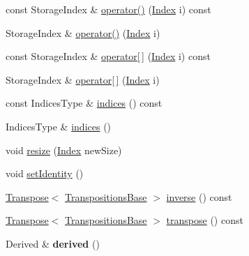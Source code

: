 \begin{DoxyCompactItemize}
const Storage\+Index \& \hyperlink{class_eigen_1_1_transpositions_base_a150860addd2418f37da291f0ad9395f2}{operator()} (\hyperlink{class_eigen_1_1_transpositions_base_a3f5f06118b419e8e6ccbe49ed5b4c91f}{Index} i) const
\item 
Storage\+Index \& \hyperlink{class_eigen_1_1_transpositions_base_a8b3eb221d9ec1e51a161d276a0020e24}{operator()} (\hyperlink{class_eigen_1_1_transpositions_base_a3f5f06118b419e8e6ccbe49ed5b4c91f}{Index} i)
\item 
const Storage\+Index \& \hyperlink{class_eigen_1_1_transpositions_base_a689c79a6cdac938218de46638decb895}{operator\mbox{[}$\,$\mbox{]}} (\hyperlink{class_eigen_1_1_transpositions_base_a3f5f06118b419e8e6ccbe49ed5b4c91f}{Index} i) const
\item 
Storage\+Index \& \hyperlink{class_eigen_1_1_transpositions_base_a8951554cfdf4840b4bab9864caecc60a}{operator\mbox{[}$\,$\mbox{]}} (\hyperlink{class_eigen_1_1_transpositions_base_a3f5f06118b419e8e6ccbe49ed5b4c91f}{Index} i)
\item 
const Indices\+Type \& \hyperlink{class_eigen_1_1_transpositions_base_a90acc796341b4627882705d1099e593d}{indices} () const
\item 
Indices\+Type \& \hyperlink{class_eigen_1_1_transpositions_base_a20eda0545eb00e887959f38b3a428a96}{indices} ()
\item 
void \hyperlink{class_eigen_1_1_transpositions_base_a3dfa713d74fc1f9a7e589b3d428f7849}{resize} (\hyperlink{class_eigen_1_1_transpositions_base_a3f5f06118b419e8e6ccbe49ed5b4c91f}{Index} new\+Size)
\item 
void \hyperlink{class_eigen_1_1_transpositions_base_a8da379438691ea694948ea5ae31d305f}{set\+Identity} ()
\item 
\hyperlink{group___core___module_class_eigen_1_1_transpose}{Transpose}$<$ \hyperlink{class_eigen_1_1_transpositions_base}{Transpositions\+Base} $>$ \hyperlink{class_eigen_1_1_transpositions_base_affcac2f2ebcd5a8bf9067e20d3681d78}{inverse} () const
\item 
\hyperlink{group___core___module_class_eigen_1_1_transpose}{Transpose}$<$ \hyperlink{class_eigen_1_1_transpositions_base}{Transpositions\+Base} $>$ \hyperlink{class_eigen_1_1_transpositions_base_a2ddede41421797738fc58ee1074efb8f}{transpose} () const
\item 
\mbox{\label{class_eigen_1_1_transpositions_base_a108277feb5d561ccd82a92b54d551131}} 
Derived \& {\bfseries derived} ()
\item 

\end{DoxyCompactItemize}
